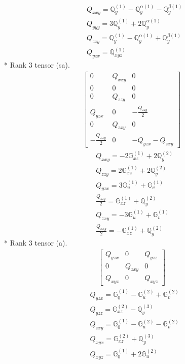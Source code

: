 \documentclass[fleqn,8pt,landscape]{jsarticle}
\begin{document}
\begin{align*}
& Q_{xxy} = \mathbb{Q}_{y}^{(1)} - \mathbb{Q}_{y}^{\alpha(1)} - \mathbb{Q}_{y}^{\beta(1)} \\
& Q_{yyy} = 3 \mathbb{Q}_{y}^{(1)} + 2 \mathbb{Q}_{y}^{\alpha(1)} \\
& Q_{zzy} = \mathbb{Q}_{y}^{(1)} - \mathbb{Q}_{y}^{\alpha(1)} + \mathbb{Q}_{y}^{\beta(1)} \\
& Q_{yzx} = \mathbb{Q}_{xyz}^{(1)}
\end{align*}
* Rank 3 tensor (sa).
\begin{align*}
\begin{bmatrix} 0 & Q_{xxy} & 0 \\ 0 & 0 & 0 \\ 0 & Q_{zzy} & 0 \\ Q_{yzx} & 0 & - \frac{Q_{zzy}}{2} \\ 0 & Q_{zxy} & 0 \\ - \frac{Q_{xxy}}{2} & 0 & - Q_{yzx} - Q_{zxy} \end{bmatrix}
\end{align*}
\begin{align*}
& Q_{xxy} = - 2 \mathbb{G}_{xz}^{(1)} + 2 \mathbb{Q}_{y}^{(2)} \\
& Q_{zzy} = 2 \mathbb{G}_{xz}^{(1)} + 2 \mathbb{Q}_{y}^{(2)} \\
& Q_{yzx} = 3 \mathbb{G}_{u}^{(1)} + \mathbb{G}_{v}^{(1)} \\
& \frac{Q_{zzy}}{2} = \mathbb{G}_{xz}^{(1)} + \mathbb{Q}_{y}^{(2)} \\
& Q_{zxy} = - 3 \mathbb{G}_{u}^{(1)} + \mathbb{G}_{v}^{(1)} \\
& \frac{Q_{xxy}}{2} = - \mathbb{G}_{xz}^{(1)} + \mathbb{Q}_{y}^{(2)}
\end{align*}
* Rank 3 tensor (a).
\begin{align*}
\begin{bmatrix} Q_{yzx} & 0 & Q_{yzz} \\ 0 & Q_{zxy} & 0 \\ Q_{xyx} & 0 & Q_{xyz} \end{bmatrix}
\end{align*}
\begin{align*}
& Q_{yzx} = \mathbb{G}_{0}^{(1)} - \mathbb{G}_{u}^{(2)} + \mathbb{G}_{v}^{(2)} \\
& Q_{yzz} = \mathbb{G}_{xz}^{(2)} - \mathbb{Q}_{y}^{(3)} \\
& Q_{zxy} = \mathbb{G}_{0}^{(1)} - \mathbb{G}_{u}^{(2)} - \mathbb{G}_{v}^{(2)} \\
& Q_{xyx} = \mathbb{G}_{xz}^{(2)} + \mathbb{Q}_{y}^{(3)} \\
& Q_{xyz} = \mathbb{G}_{0}^{(1)} + 2 \mathbb{G}_{u}^{(2)}
\end{align*}
\end{document}
